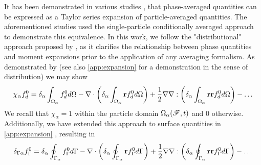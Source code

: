 It has been demonstrated in various studies \citep{buyevich1979flow,lhuillier1992ensemble,zhang1994averaged}, that phase-averaged quantities can be expressed as a Taylor series expansion of particle-averaged quantities. 
The aforementioned studies used the single-particle conditionally averaged approach to demonstrate this equivalence.  
In this work, we follow the "distributional" approach proposed by \citet{pahtz2025general}, as it clarifies the relationship between phase quantities and moment expansions prior to the application of any averaging formalism.
As demonstrated by \citet{pahtz2025general} (see also \ref{app:expansion} for a demonstration in the sense of distribution) we may show
\begin{equation}
    \chi_\alpha f^0_d 
    =\delta_\alpha\intO{f^0_d}
    - \div\left(\delta_\alpha\intO{\textbf{r} f^0_d}\right)
    + \frac{1}{2}\grad\grad :\left(\delta_\alpha\intO{\textbf{rr} f^0_d}\right)-
    \ldots 
    \label{eq:fd_asympt0}
\end{equation}
We recall that $\chi_\alpha = 1$ within the particle domain $\Omega_\alpha(\mathscr{F}, t)$ and $0$ otherwise. 
Additionally, we have extended this approach to surface quantities in \ref{app:expansion} , resulting in
\begin{equation}
    \delta_{\Gamma\alpha}f_\Gamma^0  
=\delta_\alpha\intS{f^0_\Gamma}
- \div\left(\delta_\alpha\intS{\textbf{r} f^0_\Gamma}\right)
+ \frac{1}{2}\grad\grad :\left(\delta_\alpha\intS{\textbf{rr} f^0_\Gamma}\right)-
\ldots 
\label{eq:fG_asympt0}
\end{equation}
